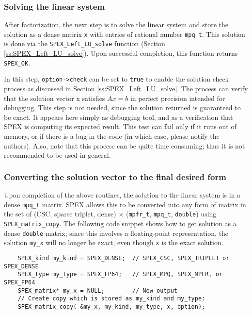 \documentclass[12pt]{report}
\theoremstyle{definition}
\begin{document}
\subsubsection{Solving the linear system}

After factorization, the next step is to solve the linear system and store the
solution as a dense matrix \verb|x| with entries of rational number
\verb|mpq_t|. This solution is done via the \verb|SPEX_Left_LU_solve|
function (Section \ref{ss:SPEX_Left_LU_solve}). 
Upon successful completion, this function returns \verb|SPEX_OK|.

In this step, \verb|option->check| can be set to \verb|true| to enable the
solution check process as discussed in Section \ref{ss:SPEX_Left_LU_solve}.  The
process can verify that the solution vector x satisfies $Ax=b$ in perfect
precision intended for debugging.  This step is not needed, since the solution
returned is guaranteed to be exact.   It appears here simply as debugging tool,
and as a verification that SPEX is computing its expected result.  This test
can fail only if it runs out of memory, or if there is a bug in the code (in
which case, please notify the authors).  Also, note that this process can be
quite time consuming; thus it is not recommended to be used in general.

\subsubsection{Converting the solution vector to the final desired form}

Upon completion of the above routines, the solution to the linear system is in
a dense \verb|mpq_t| matrix. SPEX allows this to be converted into any form
of matrix in the set of (CSC, sparse triplet, dense) $\times$ (\verb|mpfr_t|,
\verb|mpq_t|, \verb|double|) using \verb|SPEX_matrix_copy|. The following code
snippet shows how to get solution as a dense \verb|double| matrix; since this
involves a floating-point representation, the solution \verb|my_x| will no
longer be exact, even though \verb|x| is the exact solution.

{\small
\begin{verbatim}
    SPEX_kind my_kind = SPEX_DENSE;  // SPEX_CSC, SPEX_TRIPLET or SPEX_DENSE
    SPEX_type my_type = SPEX_FP64;   // SPEX_MPQ, SPEX_MPFR, or SPEX_FP64
    SPEX_matrix* my_x = NULL;        // New output
    // Create copy which is stored as my_kind and my_type:
    SPEX_matrix_copy( &my_x, my_kind, my_type, x, option);\end{verbatim} }
\end{document}
